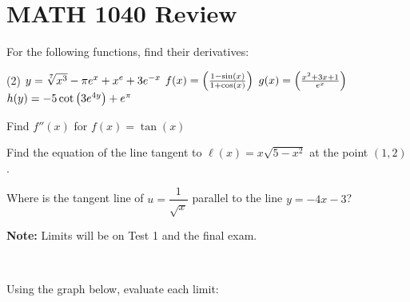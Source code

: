 \documentclass[mathNotesPreamble]{subfiles}
\begin{document}
\section{MATH 1040 Review}
  For the following functions, find their derivatives:
  \begin{tasks}[label=\hspace*{0pt},after-item-skip=\stretch{0.5}](2)
    \task $y=\sqrt[7]{x^3}-\pi e^x+x^e+3e\inv[x]$
    \task $f(x)=\parens{\frac{1-\sin(x)}{1+\cos(x)}}$
    \task $g(x)=\parens{\frac{x^2+3x+1}{e^x}}$
    \task $h(y)=-5\cot\parens{3e^{4y}}+e^\pi$
  \end{tasks}
  Find $f''(x)$ for $f(x)=\tan(x)$
  \pagebreak
  
  Find the equation of the line tangent to $\ell(x)=x\sqrt{5-x^2}$ at the point $(1,2)$.
  
  Where is the tangent line of $u=\dfrac{1}{\sqrt x}$ parallel to the line $y=-4x-3$?
  \pagebreak

  \noindent
  \textbf{Note:} Limits will be on Test 1 and the final exam.
  \begin{ex*}~

  Using the graph below, evaluate each limit:
  \end{ex*}
  
\end{document}
